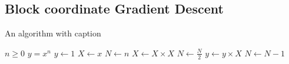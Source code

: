 \documentclass{article}
\begin{document}
\subsection{Block coordinate Gradient Descent}
\begin{algorithm}
\caption{An algorithm with caption}\label{alg:cap}
\begin{algorithmic}
\Require $n \geq 0$
\Ensure $y = x^n$
\State $y \gets 1$
\State $X \gets x$
\State $N \gets n$
    \State $X \gets X \times X$
    \State $N \gets \frac{N}{2}$  
    \State $y \gets y \times X$
    \State $N \gets N - 1$
\EndIf
\EndWhile
\end{algorithmic}
\end{algorithm}
\end{document}
